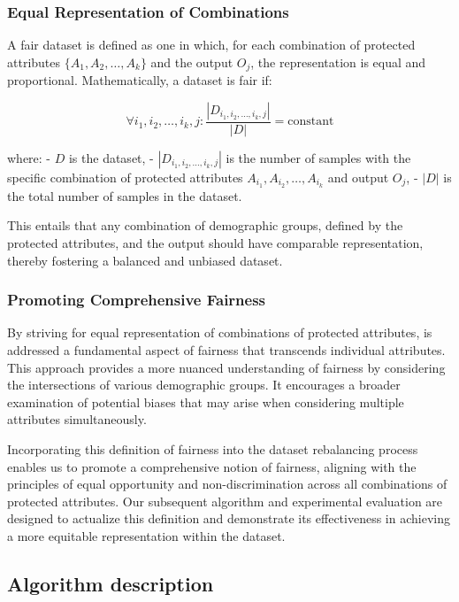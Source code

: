 \documentclass[12pt,a4paper,openright,twoside]{book}
\begin{document}
\subsubsection{Equal Representation of Combinations}

A fair dataset is defined as one in which, for each combination of protected attributes $\{A_1, A_2, \ldots, A_k\}$ and the output $O_j$, the representation is equal and proportional. Mathematically, a dataset is fair if:

\[
\forall i_1, i_2, \ldots, i_k, j: \frac{|D_{i_1, i_2, \ldots, i_k, j}|}{|D|} = \text{constant}
\]

where:
- $D$ is the dataset,
- $|D_{i_1, i_2, \ldots, i_k, j}|$ is the number of samples with the specific combination of protected attributes $A_{i_1}, A_{i_2}, \ldots, A_{i_k}$ and output $O_j$,
- $|D|$ is the total number of samples in the dataset.

This entails that any combination of demographic groups, defined by the protected attributes, and the output should have comparable representation, thereby fostering a balanced and unbiased dataset.

\subsubsection{Promoting Comprehensive Fairness}

By striving for equal representation of combinations of protected attributes, is addressed a fundamental aspect of fairness that transcends individual attributes. This approach provides a more nuanced understanding of fairness by considering the intersections of various demographic groups. It encourages a broader examination of potential biases that may arise when considering multiple attributes simultaneously.

Incorporating this definition of fairness into the dataset rebalancing process enables us to promote a comprehensive notion of fairness, aligning with the principles of equal opportunity and non-discrimination across all combinations of protected attributes. Our subsequent algorithm and experimental evaluation are designed to actualize this definition and demonstrate its effectiveness in achieving a more equitable representation within the dataset.

\subsection{Algorithm description}
\end{document}
